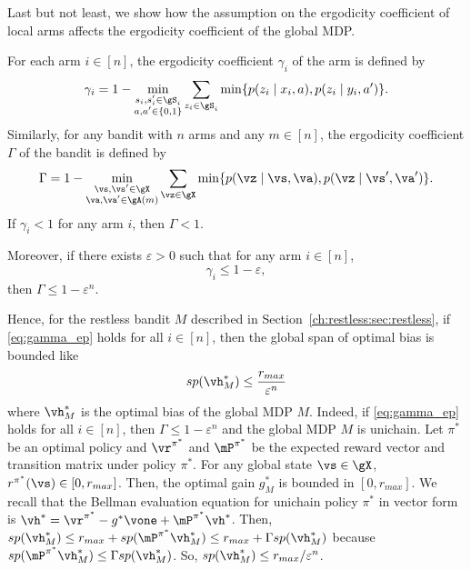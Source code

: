 Last but not least, we show how the assumption on the ergodicity coefficient of local arms affects the ergodicity coefficient of the global MDP.
\begin{thm}
    \label{thm:ergodicity_coeff}
    For each arm $i\in[n]$, the ergodicity coefficient $\gamma_i$ of the arm is defined by
    \begin{align*}
        \gamma_i = 1-\min_{\substack{s_i,s'_i\in\gS_i \\a,a'\in\{0,1\}}} \sum_{z_i\in\gS_i} \min\{p(z_i \mid x_i, a), p(z_i \mid y_i, a')\}.
    \end{align*}
    Similarly, for any bandit with $n$ arms and any $m\in[n]$, the ergodicity coefficient $\Gamma$ of the bandit is defined by
    \begin{align*}
        \Gamma = 1-\min_{\substack{\vs,\vs'\in\gX \\\va,\va'\in\gA(m)}} \sum_{\vz\in\gX} \min\{p(\vz \mid \vs, \va), p(\vz \mid \vs', \va')\}.
    \end{align*}
    If $\gamma_i<1$ for any arm $i$, then $\Gamma<1$.

    Moreover, if there exists $\varepsilon>0$ such that for any arm $i\in[n]$,
    \begin{equation}
        \label{eq:gamma_ep}
        \gamma_i \le 1-\varepsilon,
    \end{equation}
    then $\Gamma \le 1-\varepsilon^n$.
\end{thm}
Hence, for the restless bandit $M$ described in Section~\ref{ch:restless:sec:restless}, if \eqref{eq:gamma_ep} holds for all $i\in[n]$, then the global span of optimal bias is bounded like 
\begin{align}
    sp(\vh^*_M)\le \frac{r_{max}}{\varepsilon^n} \label{eq:span_expo}
\end{align}
where $\vh^*_M$ is the optimal bias of the global MDP $M$.
Indeed, if \eqref{eq:gamma_ep} holds for all $i\in[n]$, then $\Gamma \le 1-\varepsilon^n$ and the global MDP $M$ is unichain.
Let $\pi^*$ be an optimal policy and $\vr^{\pi^*}$ and $\mP^{\pi^*}$ be the expected reward vector and transition matrix under policy $\pi^*$.
For any global state $\vs\in\gX$, $r^{\pi^*}(\vs)\in[0,r_{max}]$.
Then, the optimal gain $g^*_M$ is bounded in $[0, r_{max}]$.
We recall that the Bellman evaluation equation for unichain policy $\pi^*$ in vector form is $\vh^*=\vr^{\pi^*} - g^*\vone +\mP^{\pi^*}\vh^*$.
Then, $sp(\vh^*_M)\le r_{max} +sp(\mP^{\pi^*}\vh^*_M)\le r_{max} +\Gamma sp(\vh^*_M)$ because $sp(\mP^{\pi^*}\vh^*_M)\le \Gamma sp(\vh^*_M)$.
So, $sp(\vh^*_M)\le r_{max}/\varepsilon^n$.

